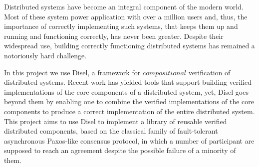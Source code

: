 Distributed systems have become an integral component of the modern world.
Most of these system power application with over a million users and, thus,
the importance of correctly implementing such systems, that keeps them up and
running and functioning correctly, has never been greater.
Despite their widespread use, building correctly functioning distributed systems
has remained a notoriously hard challenge.

In this project we use Disel, a framework for $compositional$ verification
of distributed systems. Recent work has yielded tools that support building
verified implementations of the core components of a distributed system, yet,
Disel goes beyond them by enabling one to combine
the verified implementations of the core components to produce a
correct implementation of the entire distributed system.
This project aims to use Disel to implement a library of reusable
verified distributed components, based on the classical family of
fault-tolerant asynchronous Paxos-like consensus protocol, in which
a number of participant are supposed to reach
an agreement despite the possible failure of a minority of them.
